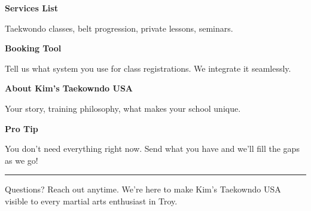 \documentclass[11pt,letterpaper]{article}
\begin{document}
\hfill
\begin{minipage}[t]{0.48\textwidth}
\begin{tcolorbox}[colframe=accent-teal, boxrule=1pt, left=0.7em, right=0.7em, top=0.5em, bottom=0.5em, arc=4pt, boxsep=0pt]
{\bfseries\small\color{accent-teal}Services List}

\vspace{0.15em}

{\small Taekwondo classes, belt progression, private lessons, seminars.}
\end{tcolorbox}

\vspace{0.1em}

\begin{tcolorbox}[colframe=accent-teal, boxrule=1pt, left=0.7em, right=0.7em, top=0.5em, bottom=0.5em, arc=4pt, boxsep=0pt]
{\bfseries\small\color{accent-teal}Booking Tool}

\vspace{0.15em}

{\small Tell us what system you use for class registrations. We integrate it seamlessly.}
\end{tcolorbox}

\vspace{0.1em}

\begin{tcolorbox}[colframe=accent-teal, boxrule=1pt, left=0.7em, right=0.7em, top=0.5em, bottom=0.5em, arc=4pt, boxsep=0pt]
{\bfseries\small\color{accent-teal}About Kim's Taekowndo USA}

\vspace{0.15em}

{\small Your story, training philosophy, what makes your school unique.}
\end{tcolorbox}

\vspace{-0.2em}
\end{minipage}

\vspace{0.15em}

\begin{tcolorbox}[colback={accent-red!5}, colframe=accent-red!20, boxrule=0.5pt, left=0.7em, right=0.7em, top=0.4em, bottom=0.4em, arc=6pt, boxsep=0pt]

{\bfseries\small\color{accent-red}Pro Tip}

\vspace{0.1em}

{\small You don't need everything right now. Send what you have and we'll fill the gaps as we go!}

\end{tcolorbox}

\vspace{0.15em}

\noindent\hrule
\vspace{0.2em}

{\small\color{text-light}Questions? Reach out anytime. We're here to make Kim's Taekowndo USA visible to every martial arts enthusiast in Troy.}
\end{document}
